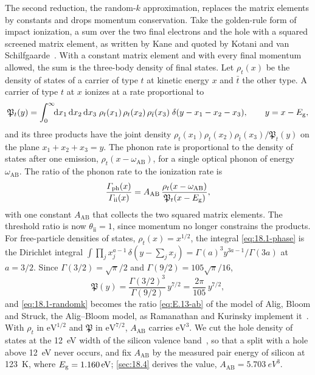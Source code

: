 The second reduction, the random-$k$ approximation, replaces the matrix elements by constants and drops momentum conservation. Take the golden-rule form of impact ionization, a sum over the two final electrons and the hole with a squared screened matrix element, as written by Kane and quoted by Kotani and van Schilfgaarde~\cite[Eq.~(5)]{kotani2010impact}. With a constant matrix element and with every final momentum allowed, the sum is the three-body density of final states. Let $\rho_t(x)$ be the density of states of a carrier of type $t$ at kinetic energy $x$ and $\bar t$ the other type. A carrier of type $t$ at $x$ ionizes at a rate proportional to
\begin{equation}
  \mathfrak{P}_t(y) = \int_0^\infty\!\!\mathrm{d} x_1\,\mathrm{d} x_2\,\mathrm{d} x_3\;\rho_t(x_1)\,\rho_t(x_2)\,\rho_{\bar t}(x_3)\;\delta(y - x_1 - x_2 - x_3) , \qquad y = x - E_{\mathrm{g}} ,
  \label{eq:18.1-phase}
\end{equation}
and its three products have the joint density $\rho_t(x_1)\rho_t(x_2)\rho_{\bar t}(x_3)/\mathfrak{P}_t(y)$ on the plane $x_1 + x_2 + x_3 = y$. The phonon rate is proportional to the density of states after one emission, $\rho_t(x - \omega_{\mathrm{AB}})$, for a single optical phonon of energy $\omega_{\mathrm{AB}}$. The ratio of the phonon rate to the ionization rate is
\begin{equation}
  \frac{\varGamma_{\mathrm{ph}}(x)}{\varGamma_{\mathrm{ii}}(x)} = A_{\mathrm{AB}}\,\frac{\rho_t(x - \omega_{\mathrm{AB}})}{\mathfrak{P}_t(x - E_{\mathrm{g}})} ,
  \label{eq:18.1-randomk}
\end{equation}
with one constant $A_{\mathrm{AB}}$ that collects the two squared matrix elements. The threshold ratio is now $\theta_{\mathrm{ii}} = 1$, since momentum no longer constrains the products. For free-particle densities of states, $\rho_t(x) = x^{1/2}$, the integral \cref{eq:18.1-phase} is the Dirichlet integral $\int\prod_j x_j^{a-1}\,\delta(y - \sum_jx_j) = \Gamma(a)^3y^{3a-1}/\Gamma(3a)$ at $a = 3/2$. Since $\Gamma(3/2) = \sqrt\pi/2$ and $\Gamma(9/2) = 105\sqrt\pi/16$,
\begin{equation*}
  \mathfrak{P}(y) = \frac{\Gamma(3/2)^3}{\Gamma(9/2)}\,y^{7/2} = \frac{2\pi}{105}\,y^{7/2} ,
\end{equation*}
and \cref{eq:18.1-randomk} becomes the ratio \cref{eq:E.13-ab} of the model of Alig, Bloom and Struck, the Alig--Bloom model, as Ramanathan and Kurinsky implement it~\cite[Eq.~(8)]{ramanathan2020ionization}. With $\rho_t$ in $\mathrm{eV}^{1/2}$ and $\mathfrak{P}$ in $\mathrm{eV}^{7/2}$, $A_{\mathrm{AB}}$ carries $\mathrm{eV}^3$. We cut the hole density of states at the \SI{12}{eV} width of the silicon valence band~\cite[Sect.~III\,A]{ramanathan2020ionization}, so that a split with a hole above \SI{12}{eV} never occurs, and fix $A_{\mathrm{AB}}$ by the measured pair energy of silicon at \SI{123}{K}, where $E_{\mathrm{g}} = \SI{1.160}{eV}$; \cref{sec:18.4} derives the value, $A_{\mathrm{AB}} = \SI{5.703}{eV^3}$.

